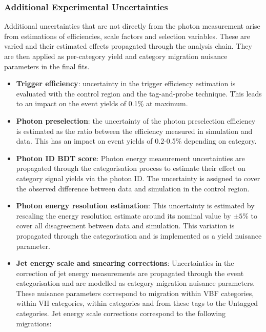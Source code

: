 \subsubsection{Additional Experimental Uncertainties}
Additional uncertainties that are not directly from the photon measurement arise from estimations of efficiencies, scale factors and selection variables. These are varied and their estimated effects propagated through the analysis chain. They are then applied as per-category yield and category migration nuisance parameters in the final fits. 
\begin{itemize}[noitemsep]
    \item {\textbf{Trigger efficiency}: 
           uncertainty in the trigger efficiency estimation is evaluated with the \Zee control region and the tag-and-probe technique. This leads to an impact on the event yields of 0.1\% at maximum.}
    \item {\textbf{Photon preselection}: 
           the uncertainty of the photon preselection efficiency is estimated as the ratio between the efficiency measured in simulation and data. This has an impact on event yields of 0.2-0.5\% depending on category.}
    \item {\textbf{Photon ID BDT score}: 
           Photon energy measurement uncertainties are propagated through the categorisation process to estimate their effect on category signal yields via the photon ID. The uncertainty is assigned to cover the observed difference between data and simulation in the \Zee control region. 
           }
    \item {\textbf{Photon energy resolution estimation}: 
        This uncertainty is estimated by rescaling the energy resolution estimate around its nominal value by $\pm{5}\%$ to cover all disagreement between data and simulation. This variation is propagated through the categorisation and is implemented as a yield nuisance parameter. 
           }
    \item {\textbf{Jet energy scale and smearing corrections}: 
           Uncertainties in the correction of jet energy measurements are propagated through the event categorisation and are modelled as category migration nuisance parameters. 
           These nuisance parameters correspond to migration within VBF categories, within VH categories, within \ttH categories and from these tags to the Untagged categories. 
           Jet energy scale corrections correspond to the following migrations: 
           \begin{itemize}[noitemsep]

\end{itemize}}
\end{itemize}
